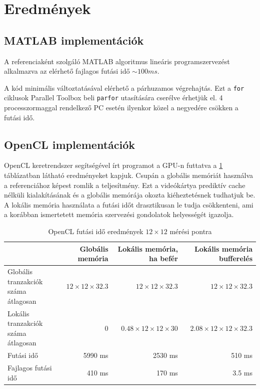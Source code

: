  \section{Eredmények} 
	\subsection{MATLAB implementációk}
	A referenciaként szolgáló MATLAB algoritmus lineáris programszervezést
	alkalmazva az elérhető fajlagos futási idő $\sim100 ms$.
	
	A kód minimális változtatásával elérhető a párhuzamos végrehajtás. Ezt a
	\texttt{for} ciklusok Parallel Toolbox beli \texttt{parfor} utasítására
	cserélve érhetjük el. 4 processzormaggal rendelkező PC esetén ilyenkor
	közel a negyedére csökken a futási idő.
	
	\subsection{OpenCL implementációk}
	OpenCL keretrendszer segítségével írt programot a GPU-n futtatva a
	\ref{table:openresult} táblázatban látható eredményeket kapjuk.
	Csupán a globális memóriát használva a referenciához képest romlik a
	teljesítmény. Ezt a videókártya prediktív cache nélküli kialakításának és a
	globális memórája okozta kiéheztetésnek tudhatjuk be.
	A lokális memória használata a futási időt drasztikusan le tudja
	csökkenteni, ami a korábban ismertetett memória szervezési gondolatok
	helyességét igazolja.
	 
	\begin{table}[!t]
	\renewcommand{\arraystretch}{1.2}
	\caption{\scriptsize OpenCL futási idő eredmények $12\times12$ mérési pontra}
	\label{table:openresult}
	\centering
	\begin{tabular}{l|r|r|r}
	 & Globális memória & Lokális memória, ha befér & Lokális memória bufferelés\\ \hline
	\parbox{2.5cm}{Globális tranzakciók száma átlagosan} & $12 \times 12\times 32.3$
	& $12 \times 12 \times 32.3$ & $12 \times 12 \times 32.3$\\
	\parbox{2.5cm}{Lokális tranzakciók száma átlagosan} & 0 &
	$0.48 \times 12 \times 12 \times 30$ & $2.08 \times 12 \times12 \times 32.3$\\
	Futási idő & 5990 ms & 2530 ms & 510 ms\\
	Fajlagos futási idő & 410 ms & 170 ms & 3.5 ms 
	\end{tabular}
	\end{table}
	
